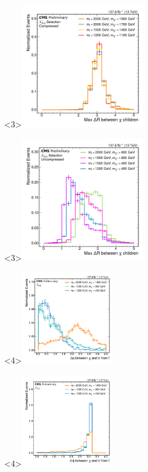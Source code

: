 \documentclass[]{beamer}
\begin{document}
\begin{frame}
\begin{center}
      \begin{onlyenv}<3>\includegraphics[width=0.4\textwidth]{figures/compressed_max_chi_child_dr.pdf} \end{onlyenv}
      \begin{onlyenv}<3>\includegraphics[width=0.4\textwidth]{figures/uncompressed_max_chi_child_dr.pdf} \end{onlyenv}
      \begin{onlyenv}<4>\includegraphics[width=0.3\textwidth]{figures/chi_b_eta.pdf} \end{onlyenv}
      \begin{onlyenv}<4>\includegraphics[width=0.3\textwidth]{figures/chi_b_phi.pdf} \end{onlyenv}

\end{center}
\end{frame}
\end{document}
